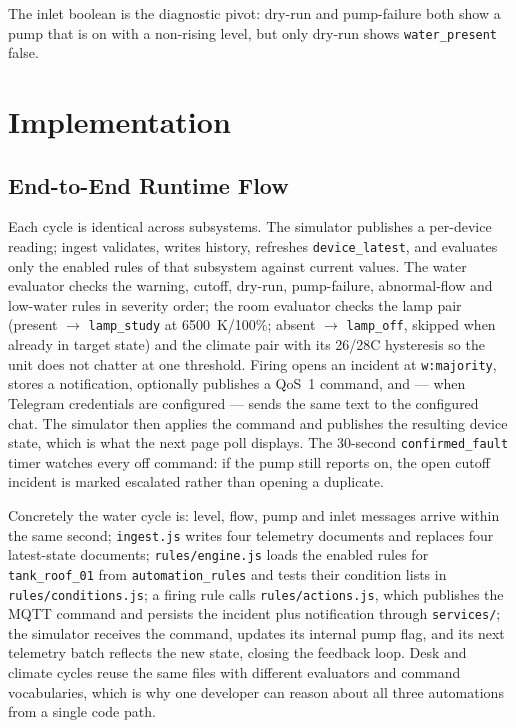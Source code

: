\documentclass[11pt,a4paper]{article}
\begin{document}
The inlet boolean is the diagnostic pivot: dry-run and pump-failure both show a pump that is on with a non-rising level, but only dry-run shows \texttt{water\_present} false.

\section{Implementation}

\subsection{End-to-End Runtime Flow}

Each cycle is identical across subsystems. The simulator publishes a per-device reading; ingest validates, writes history, refreshes \texttt{device\_latest}, and evaluates only the enabled rules of that subsystem against current values. The water evaluator checks the warning, cutoff, dry-run, pump-failure, abnormal-flow and low-water rules in severity order; the room evaluator checks the lamp pair (present $\rightarrow$ \texttt{lamp\_study} at 6500~K/100\%; absent $\rightarrow$ \texttt{lamp\_off}, skipped when already in target state) and the climate pair with its 26/28\textdegree C hysteresis so the unit does not chatter at one threshold. Firing opens an incident at \texttt{w:majority}, stores a notification, optionally publishes a QoS~1 command, and --- when Telegram credentials are configured --- sends the same text to the configured chat. The simulator then applies the command and publishes the resulting device state, which is what the next page poll displays. The 30-second \texttt{confirmed\_fault} timer watches every off command: if the pump still reports on, the open cutoff incident is marked escalated rather than opening a duplicate.

Concretely the water cycle is: level, flow, pump and inlet messages arrive within the same second; \texttt{ingest.js} writes four telemetry documents and replaces four latest-state documents; \texttt{rules/engine.js} loads the enabled rules for \texttt{tank\_roof\_01} from \texttt{automation\_rules} and tests their condition lists in \texttt{rules/conditions.js}; a firing rule calls \texttt{rules/actions.js}, which publishes the MQTT command and persists the incident plus notification through \texttt{services/}; the simulator receives the command, updates its internal pump flag, and its next telemetry batch reflects the new state, closing the feedback loop. Desk and climate cycles reuse the same files with different evaluators and command vocabularies, which is why one developer can reason about all three automations from a single code path.
\end{document}
